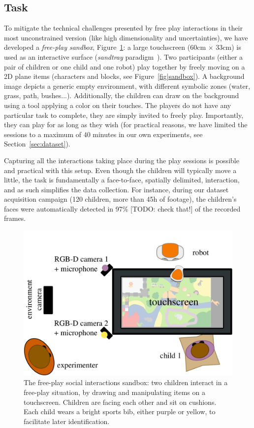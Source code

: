 \documentclass[sigconf]{acmart}
\begin{document}
\subsection{Task}


To mitigate the technical challenges presented by free play interactions in
their most unconstrained version (like high dimensionality and uncertainties),
we have developed a \emph{free-play sandbox}, Figure~\ref{fig|freeplay}: a large
touchscreen (60cm $\times$ 33cm) is used as an interactive surface
(\emph{sandtray} paradigm~\cite{baxter2012touchscreen}). Two participants (either a
pair of children or one child and one robot) play together by freely moving on a
2D plane items (characters and blocks, see Figure~\ref{fig|sandbox}). A
background image depicts a generic empty environment, with different symbolic
zones (water, grass, path, bushes...). Additionally, the children can draw on
the background using a tool applying a color on their touches. The players do
not have any particular task to complete, they are simply invited to freely
play. Importantly, they can play for as long as they wish (for
practical reasons, we have limited the sessions to a maximum of 40 minutes in
our own experiments, see Section~\ref{sec:dataset}).

Capturing all the interactions taking place during the play sessions is possible
and practical with this setup. Even though the children will typically move a
little, the task is fundamentally a face-to-face, spatially delimited,
interaction, and as such simplifies the data collection. For instance, during
our dataset acquisition campaign (120 children, more than 45h of footage), the
children's faces were automatically detected in 97\% [TODO: check that!] of the
recorded frames.


\begin{figure}
    \centering
    \includegraphics[width=0.9\columnwidth]{setup_top}
    \caption{The free-play social interactions sandbox: two children interact in
    a free-play situation, by drawing and manipulating items on a touchscreen.
    Children are facing each other and sit on cushions. Each child wears a
    bright sports bib, either purple or yellow, to facilitate later
    identification.}

    \label{fig|freeplay}
\end{figure}
\end{document}
